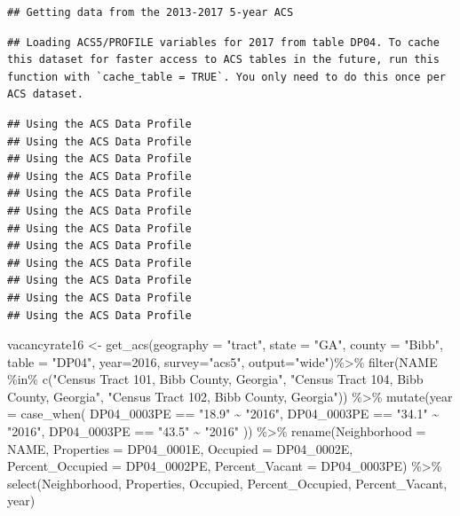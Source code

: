 \documentclass[
]{article}
\newenvironment{Shaded}{\begin{snugshade}}{\end{snugshade}}
\newcommand{\AttributeTok}[1]{\textcolor[rgb]{0.77,0.63,0.00}{#1}}
\newcommand{\DecValTok}[1]{\textcolor[rgb]{0.00,0.00,0.81}{#1}}
\newcommand{\FunctionTok}[1]{\textcolor[rgb]{0.00,0.00,0.00}{#1}}
\newcommand{\NormalTok}[1]{#1}
\newcommand{\OtherTok}[1]{\textcolor[rgb]{0.56,0.35,0.01}{#1}}
\newcommand{\SpecialCharTok}[1]{\textcolor[rgb]{0.00,0.00,0.00}{#1}}
\newcommand{\StringTok}[1]{\textcolor[rgb]{0.31,0.60,0.02}{#1}}
\begin{document}
\begin{verbatim}
## Getting data from the 2013-2017 5-year ACS
\end{verbatim}

\begin{verbatim}
## Loading ACS5/PROFILE variables for 2017 from table DP04. To cache this dataset for faster access to ACS tables in the future, run this function with `cache_table = TRUE`. You only need to do this once per ACS dataset.
\end{verbatim}

\begin{verbatim}
## Using the ACS Data Profile
## Using the ACS Data Profile
## Using the ACS Data Profile
## Using the ACS Data Profile
## Using the ACS Data Profile
## Using the ACS Data Profile
## Using the ACS Data Profile
## Using the ACS Data Profile
## Using the ACS Data Profile
## Using the ACS Data Profile
## Using the ACS Data Profile
## Using the ACS Data Profile
\end{verbatim}

\begin{Shaded}
\begin{Highlighting}[]
\NormalTok{vacancyrate16 }\OtherTok{\textless{}{-}} \FunctionTok{get\_acs}\NormalTok{(}\AttributeTok{geography =} \StringTok{"tract"}\NormalTok{, }\AttributeTok{state =} \StringTok{"GA"}\NormalTok{, }\AttributeTok{county =} \StringTok{"Bibb"}\NormalTok{, }\AttributeTok{table =} \StringTok{"DP04"}\NormalTok{,  }\AttributeTok{year=}\DecValTok{2016}\NormalTok{, }\AttributeTok{survey=}\StringTok{"acs5"}\NormalTok{, }\AttributeTok{output=}\StringTok{"wide"}\NormalTok{)}\SpecialCharTok{\%\textgreater{}\%}
\FunctionTok{filter}\NormalTok{(NAME }\SpecialCharTok{\%in\%} \FunctionTok{c}\NormalTok{(}\StringTok{"Census Tract 101, Bibb County, Georgia"}\NormalTok{, }\StringTok{"Census Tract 104, Bibb County, Georgia"}\NormalTok{, }\StringTok{"Census Tract 102, Bibb County, Georgia"}\NormalTok{)) }\SpecialCharTok{\%\textgreater{}\%}
  \FunctionTok{mutate}\NormalTok{(}\AttributeTok{year =} \FunctionTok{case\_when}\NormalTok{(}
\NormalTok{    DP04\_0003PE }\SpecialCharTok{==} \StringTok{"18.9"} \SpecialCharTok{\textasciitilde{}} \StringTok{"2016"}\NormalTok{,}
\NormalTok{    DP04\_0003PE }\SpecialCharTok{==} \StringTok{"34.1"} \SpecialCharTok{\textasciitilde{}} \StringTok{"2016"}\NormalTok{,}
\NormalTok{    DP04\_0003PE }\SpecialCharTok{==} \StringTok{"43.5"} \SpecialCharTok{\textasciitilde{}} \StringTok{"2016"}
\NormalTok{  )) }\SpecialCharTok{\%\textgreater{}\%}
  \FunctionTok{rename}\NormalTok{(}\AttributeTok{Neighborhood =}\NormalTok{ NAME,}
         \AttributeTok{Properties =}\NormalTok{ DP04\_0001E,}
         \AttributeTok{Occupied =}\NormalTok{ DP04\_0002E,}
         \AttributeTok{Percent\_Occupied =}\NormalTok{ DP04\_0002PE,}
         \AttributeTok{Percent\_Vacant =}\NormalTok{ DP04\_0003PE) }\SpecialCharTok{\%\textgreater{}\%}
   \FunctionTok{select}\NormalTok{(Neighborhood, Properties, Occupied, Percent\_Occupied, Percent\_Vacant, year) }
\end{Highlighting}
\end{Shaded}
\end{document}
